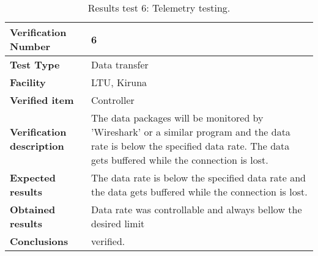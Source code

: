 \begin{table}[H]
\centering

\begin{tabular}{|m{}| m{} |}
\hline
\textbf{Verification Number} 		& 6 				\\ \hline
\textbf{Test Type} 					& Data transfer 	\\ \hline
\textbf{Facility} 					& LTU, Kiruna 		\\ \hline
\textbf{Verified item} 				& Controller 		\\ \hline

\textbf{Verification description} 	& The data packages will be monitored by 'Wireshark' or a similar program and the data rate is below the specified data rate. The data gets buffered while the connection is lost. \\ \hline

\textbf{Expected results} 			& The data rate is below the specified data rate and the data gets buffered while the connection is lost. \\ \hline

\textbf{Obtained results} 			& Data rate was controllable and always bellow the desired limit \\ \hline

\textbf{Conclusions} 				& verified.		\\ \hline
\end{tabular}
\caption{Results test 6: Telemetry testing.}
\label{tab:testresult6:telemetry}
\end{table}


\raggedbottom
